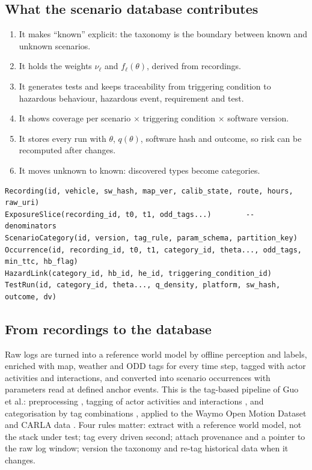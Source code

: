 \documentclass[11pt,a4paper]{article}
\begin{document}
\subsection{What the scenario database contributes}
\begin{enumerate}
\item It makes ``known'' explicit: the taxonomy is the boundary between known and unknown scenarios.
\item It holds the weights $\nu_\ell$ and $f_\ell(\theta)$, derived from recordings.
\item It generates tests and keeps traceability from triggering condition to hazardous behaviour, hazardous event, requirement and test.
\item It shows coverage per scenario $\times$ triggering condition $\times$ software version.
\item It stores every run with $\theta$, $q(\theta)$, software hash and outcome, so risk can be recomputed after changes.
\item It moves unknown to known: discovered types become categories.
\end{enumerate}
\begin{lstlisting}
Recording(id, vehicle, sw_hash, map_ver, calib_state, route, hours, raw_uri)
ExposureSlice(recording_id, t0, t1, odd_tags...)        -- denominators
ScenarioCategory(id, version, tag_rule, param_schema, partition_key)
Occurrence(id, recording_id, t0, t1, category_id, theta..., odd_tags, min_ttc, hb_flag)
HazardLink(category_id, hb_id, he_id, triggering_condition_id)
TestRun(id, category_id, theta..., q_density, platform, sw_hash, outcome, dv)
\end{lstlisting}

\subsection{From recordings to the database}
Raw logs are turned into a reference world model by offline perception and labels, enriched with map, weather and ODD tags for every time step, tagged with actor activities and interactions, and converted into scenario occurrences with parameters read at defined anchor events. This is the tag-based pipeline of Guo et al.: preprocessing \cite[Sec.~III-A]{guo2023}, tagging of actor activities \cite[Sec.~III-B.1]{guo2023} and interactions \cite[Secs.~III-B.2, III-B.3]{guo2023}, and categorisation by tag combinations \cite[Sec.~III-C]{guo2023}, applied to the Waymo Open Motion Dataset and CARLA data \cite[Sec.~IV]{guo2023}. Four rules matter: extract with a reference world model, not the stack under test; tag every driven second; attach provenance and a pointer to the raw log window; version the taxonomy and re-tag historical data when it changes.
\end{document}
